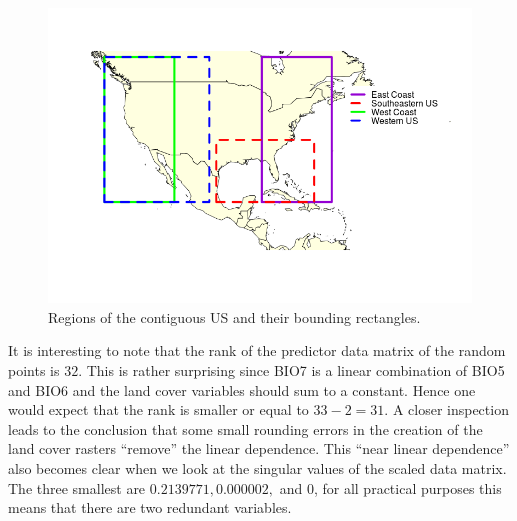 \begin{figure}[!htb]
\centering
\includegraphics[scale=0.6]{Plots/StudyExtent.png}
\caption{\label{fig:studyExtent}Regions of the contiguous US and their bounding rectangles.}
\end{figure}

It is interesting to note that the rank of the predictor data matrix of the random points is $32$. This is rather surprising since BIO7 is a linear combination of BIO5 and BIO6 and the land cover variables should sum to a constant. Hence one would expect that the rank is smaller or equal to $33-2 =31$. A closer inspection leads to the conclusion that some small rounding errors in the creation of the land cover rasters ``remove'' the linear dependence. This ``near linear dependence'' also becomes clear when we look at the singular values of the scaled data matrix. The three smallest are $0.2139771, 0.000002,$ and $0$, for all practical purposes this means that there are two redundant variables.\\

